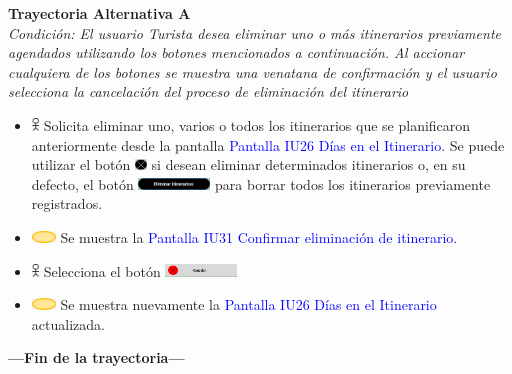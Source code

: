 \textbf{Trayectoria Alternativa A}\\
\textit{Condición: El usuario Turista desea eliminar uno o más itinerarios previamente agendados utilizando los botones mencionados a continuación. Al accionar cualquiera de los botones se muestra una venatana de confirmación y el usuario selecciona la cancelación del proceso de eliminación del itinerario}
\begin{itemize}
    \item \includegraphics[width=0.0150\textwidth]{Figuras/persona.png} Solicita eliminar uno, varios o todos los itinerarios que se planificaron anteriormente desde la pantalla {\textcolor{blue}{Pantalla IU26 Días en el Itinerario}}. Se puede utilizar el botón \includegraphics[width=0.0250\textwidth]{ComponentesCU/Eliminar.PNG} si desean eliminar determinados itinerarios o, en su defecto, el botón \includegraphics[width=0.150\textwidth]{ComponentesCU/EliminarItinerarios.PNG} para borrar todos los itinerarios previamente registrados.
    \item \includegraphics[width=0.0500\textwidth]{Figuras/sistema.png} Se muestra la {\textcolor{blue}{Pantalla IU31 Confirmar eliminación de itinerario}}.
    \item \includegraphics[width=0.0150\textwidth]{Figuras/persona.png} Selecciona el botón \includegraphics[width=0.1500\textwidth]{ComponentesCU/img3.png}
    \item \includegraphics[width=0.0500\textwidth]{Figuras/sistema.png} Se muestra nuevamente la {\textcolor{blue}{Pantalla IU26 Días en el Itinerario}} actualizada.
    
\end{itemize}
\textbf{---Fin de la trayectoria---}
\vspace{15pt}\\
